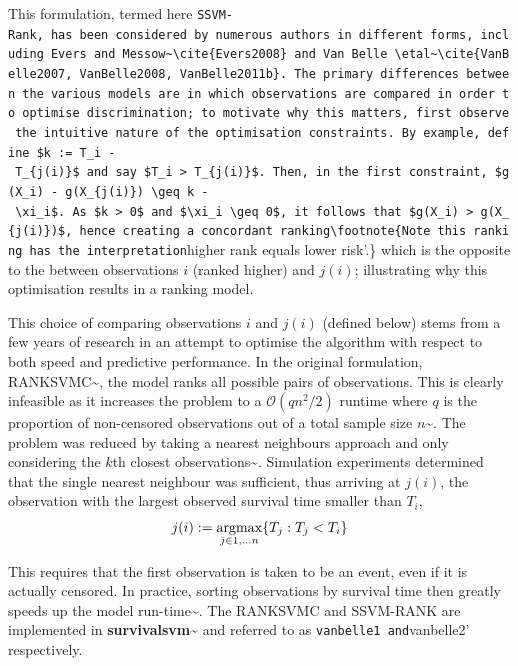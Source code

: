 \documentclass[
  letterpaper,
]{scrbook}
\theoremstyle{plain}
\theoremstyle{definition}
\theoremstyle{remark}
\begin{document}
This formulation, termed here
\texttt{SSVM-Rank\textquotesingle{},\ has\ been\ considered\ by\ numerous\ authors\ in\ different\ forms,\ including\ Evers\ and\ Messow\textasciitilde{}\textbackslash{}cite\{Evers2008\}\ and\ Van\ Belle\ \textbackslash{}etal\textasciitilde{}\textbackslash{}cite\{VanBelle2007,\ VanBelle2008,\ VanBelle2011b\}.\ The\ primary\ differences\ between\ the\ various\ models\ are\ in\ which\ observations\ are\ compared\ in\ order\ to\ optimise\ discrimination;\ to\ motivate\ why\ this\ matters,\ first\ observe\ the\ intuitive\ nature\ of\ the\ optimisation\ constraints.\ By\ example,\ define\ \$k\ :=\ T\_i\ -\ T\_\{j(i)\}\$\ and\ say\ \$T\_i\ \textgreater{}\ T\_\{j(i)\}\$.\ Then,\ in\ the\ first\ constraint,\ \$g(X\_i)\ -\ g(X\_\{j(i)\})\ \textbackslash{}geq\ k\ -\ \textbackslash{}xi\_i\$.\ As\ \$k\ \textgreater{}\ 0\$\ and\ \$\textbackslash{}xi\_i\ \textbackslash{}geq\ 0\$,\ it\ follows\ that\ \$g(X\_i)\ \textgreater{}\ g(X\_\{j(i)\})\$,\ hence\ creating\ a\ concordant\ ranking\textbackslash{}footnote\{Note\ this\ ranking\ has\ the\ interpretation}higher
rank equals lower risk'.\} which is the opposite to the between
observations \(i\) (ranked higher) and \(j(i)\); illustrating why this
optimisation results in a ranking model.

This choice of comparing observations \(i\) and \(j(i)\) (defined below)
stems from a few years of research in an attempt to optimise the
algorithm with respect to both speed and predictive performance. In the
original formulation, RANKSVMC\textasciitilde{}\cite{VanBelle2007}, the
model ranks all possible pairs of observations. This is clearly
infeasible as it increases the problem to a \(\mathcal{O}(qn^2/2)\)
runtime where \(q\) is the proportion of non-censored observations out
of a total sample size \(n\)\textasciitilde{}\cite{VanBelle2008}. The
problem was reduced by taking a nearest neighbours approach and only
considering the \(k\)th closest
observations\textasciitilde{}\cite{VanBelle2008}. Simulation experiments
determined that the single nearest neighbour was sufficient, thus
arriving at \(j(i)\), the observation with the largest observed survival
time smaller than \(T_i\), \[
j(i) := \operatornamewithlimits{argmax}_{j \in 1,...n} \{T_j : T_j < T_i\}
\]

This requires that the first observation is taken to be an event, even
if it is actually censored. In practice, sorting observations by
survival time then greatly speeds up the model
run-time\textasciitilde{}\cite{pkgsurvivalsvm}. The RANKSVMC and
SSVM-RANK are implemented in
\textbf{survivalsvm}\textasciitilde{}\cite{pkgsurvivalsvm} and referred
to as \texttt{vanbelle1\textquotesingle{}\ and}vanbelle2' respectively.
\end{document}
